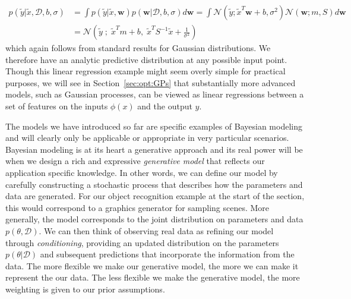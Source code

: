 \begin{align}
p(\tilde{y}| \tilde{x},\mathcal{D}, b,\sigma) &= \int p(\tilde{y}| \tilde{x},\mathbf{w}) 
p(\mathbf{w}| \mathcal{D}, b,\sigma) d\mathbf{w} 
= \int \mathcal{N}(\tilde{y};\tilde{x}^T\mathbf{w}+b,\sigma^2)
\mathcal{N}\left(\mathbf{w} ; m, S\right) d\mathbf{w} \nonumber \\
&= \mathcal{N} \left(\tilde{y} \; ; \;\tilde{x}^Tm+b, \; \tilde{x}^T S^{-1}\tilde{x}+\frac{1}{\sigma^2} \right)
\end{align}
which again follows from standard results for Gaussian distributions.  We therefore have
an analytic predictive distribution at any possible input point.
Though this linear regression example might seem overly simple for practical purposes, we
will see in Section~\ref{sec:opt:GPs} that substantially more advanced models, such as
Gaussian processes, can be viewed as linear regressions between a set of features on the inputs $\phi(x)$
and the output $y$.

The models we have introduced so far are specific examples of Bayesian modeling and will
clearly only be applicable or appropriate in very particular scenarios.  
Bayesian modeling is at its heart a
generative approach and its real power will be when we design a rich and expressive \emph{generative model} 
that reflects our application specific knowledge.  In other words, we can define our model
by carefully constructing a stochastic process that describes how the parameters  and data are generated.  For
our object recognition example at the start of the section, this would correspond to a graphics generator for
sampling scenes.
More generally, the model corresponds to the joint distribution on parameters and data $p(\theta,\mathcal{D})$.
We can then think of observing real data as refining our model through \emph{conditioning}, providing an updated distribution
on the parameters $p(\theta|\mathcal{D})$ and subsequent predictions that incorporate the information from the data.  The more
flexible we make our generative model, the more we can make it represent the our data.  The less flexible
we make the generative model, the more weighting is given to our prior assumptions.

